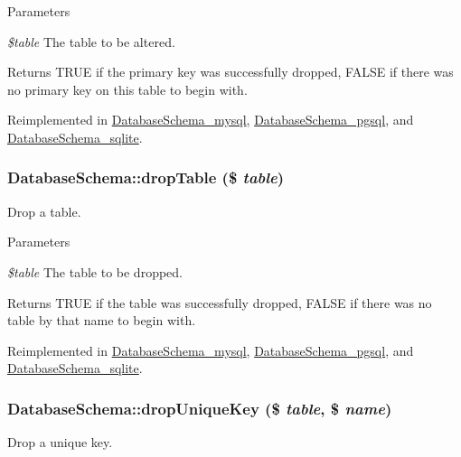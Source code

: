 \begin{DoxyParams}{Parameters}
\item[{\em \$table}]The table to be altered.\end{DoxyParams}
\begin{DoxyReturn}{Returns}
TRUE if the primary key was successfully dropped, FALSE if there was no primary key on this table to begin with. 
\end{DoxyReturn}


Reimplemented in \hyperlink{classDatabaseSchema__mysql_adf1b000bebd7b19a83506a01dab36972}{DatabaseSchema\_\-mysql}, \hyperlink{classDatabaseSchema__pgsql_ae1548317341c45c01e0c67f9ebd9a057}{DatabaseSchema\_\-pgsql}, and \hyperlink{classDatabaseSchema__sqlite_a2fe8b467c14e7fca2f24b2af6487db4c}{DatabaseSchema\_\-sqlite}.\hypertarget{classDatabaseSchema_a61a37e713374b88d28161e0ade1a5c78}{
\subsubsection[{dropTable}]{\setlength{\rightskip}{0pt plus 5cm}DatabaseSchema::dropTable (\$ {\em table})}}
\label{classDatabaseSchema_a61a37e713374b88d28161e0ade1a5c78}
Drop a table.


\begin{DoxyParams}{Parameters}
\item[{\em \$table}]The table to be dropped.\end{DoxyParams}
\begin{DoxyReturn}{Returns}
TRUE if the table was successfully dropped, FALSE if there was no table by that name to begin with. 
\end{DoxyReturn}


Reimplemented in \hyperlink{classDatabaseSchema__mysql_a9dbfabde4257668bdeb08965735fb823}{DatabaseSchema\_\-mysql}, \hyperlink{classDatabaseSchema__pgsql_a7d84e7dde7dfcf415b5732eb6f97fbe0}{DatabaseSchema\_\-pgsql}, and \hyperlink{classDatabaseSchema__sqlite_adfb4c367167a77d523c3d002af1fc7cc}{DatabaseSchema\_\-sqlite}.\hypertarget{classDatabaseSchema_a40519a35f27d1bfe0f2eb0e759df1afd}{
\subsubsection[{dropUniqueKey}]{\setlength{\rightskip}{0pt plus 5cm}DatabaseSchema::dropUniqueKey (\$ {\em table}, \/  \$ {\em name})}}
\label{classDatabaseSchema_a40519a35f27d1bfe0f2eb0e759df1afd}
Drop a unique key.


